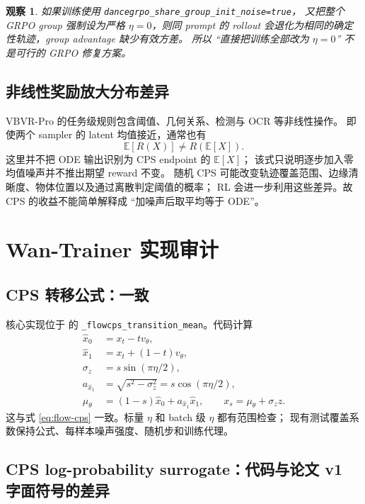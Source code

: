 \documentclass[11pt,a4paper]{article}
\newcommand{\code}[1]{\texttt{#1}}
\newtheorem{observation}{观察}
\begin{document}
\begin{observation}
如果训练使用 \code{dancegrpo\_share\_group\_init\_noise=true}，
又把整个 GRPO group 强制设为严格 $\eta=0$，则同 prompt 的 rollout
会退化为相同的确定性轨迹，group advantage 缺少有效方差。
所以 ``直接把训练全部改为 $\eta=0$'' 不是可行的 GRPO 修复方案。
\end{observation}

\subsection{非线性奖励放大分布差异}

VBVR-Pro 的任务级规则包含阈值、几何关系、检测与 OCR 等非线性操作。
即使两个 sampler 的 latent 均值接近，通常也有
\[
  \mathbb{E}[R(X)]\neq R(\mathbb{E}[X]).
\]
这里并不把 ODE 输出识别为 CPS endpoint 的 $\mathbb{E}[X]$；
该式只说明逐步加入零均值噪声并不推出期望 reward 不变。
随机 CPS 可能改变轨迹覆盖范围、边缘清晰度、物体位置以及通过离散判定阈值的概率；
RL 会进一步利用这些差异。故 CPS 的收益不能简单解释成
``加噪声后取平均等于 ODE''。

\section{Wan-Trainer 实现审计}

\subsection{CPS 转移公式：一致}

核心实现位于
 的
\code{\_flowcps\_transition\_mean}。代码计算
\begin{align}
  \widehat{x}_0 &=x_t-t v_\theta,\\
  \widehat{x}_1 &=x_t+(1-t)v_\theta,\\
  \sigma_z &=s\sin(\pi\eta/2),\\
  a_{\widehat{x}_1}
    &=\sqrt{s^2-\sigma_z^2}
      =s\cos(\pi\eta/2),\\
  \mu_\theta&=(1-s)\widehat{x}_0
              +a_{\widehat{x}_1}\widehat{x}_1,
 \qquad
  x_s=\mu_\theta+\sigma_z z.
\end{align}
这与式 \eqref{eq:flow-cps} 一致。标量 $\eta$ 和 batch 级 $\eta$ 都有范围检查；
现有测试覆盖系数保持公式、每样本噪声强度、随机步和训练代理。

\subsection{CPS log-probability surrogate：代码与论文 v1 字面符号的差异}
\end{document}
